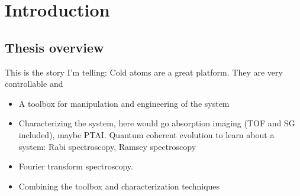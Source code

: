 
\renewcommand{\thechapter}{1}

\chapter{Introduction}



\section{Thesis overview}


This is the story I'm telling: Cold atoms are a great platform. They are very controllable and 

\begin{itemize}
	\item A toolbox for manipulation and engineering of the system
	\item Characterizing the system, here would go absorption imaging (TOF and SG included), maybe PTAI. Quantum coherent evolution to learn about a system: Rabi spectroscopy, Ramsey spectroscopy
	\item Fourier transform spectroscopy.
	\item Combining the toolbox and characterization techniques 
\end{itemize}
